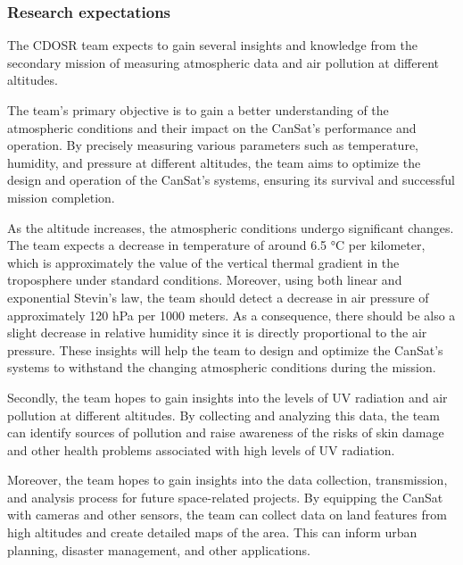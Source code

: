 \documentclass[11pt]{article}
\begin{document}
\subsubsection{Research expectations}

The CDOSR team expects to gain several insights and knowledge from the secondary mission of measuring atmospheric data and air pollution at different altitudes.

The team's primary objective is to gain a better understanding of the atmospheric conditions and their impact on the CanSat's performance and operation. By precisely measuring various parameters such as temperature, humidity, and pressure at different altitudes, the team aims to optimize the design and operation of the CanSat's systems, ensuring its survival and successful mission completion.

As the altitude increases, the atmospheric conditions undergo significant changes. The team expects a decrease in temperature of around 6.5 °C per kilometer, which is approximately the value of the vertical thermal gradient in the troposphere under standard conditions. Moreover, using both linear and exponential Stevin's law, 
the team should detect a decrease in air pressure of approximately 120 hPa per 1000 meters. As a consequence, there should be also a slight decrease in relative humidity since it is directly proportional to the air pressure. These insights will help the team to design and optimize the CanSat's systems to withstand the changing atmospheric conditions during the mission.

Secondly, the team hopes to gain insights into the levels of UV radiation and air pollution at different altitudes. By collecting and analyzing this data, the team can identify sources of pollution and raise awareness of the risks of skin damage and other health problems associated with high levels of UV radiation.

Moreover, the team hopes to gain insights into the data collection, transmission, and analysis process for future space-related projects. By equipping the CanSat with cameras and other sensors, the team can collect data on land features from high altitudes and create detailed maps of the area. This can inform urban planning, disaster management, and other applications.
\end{document}
